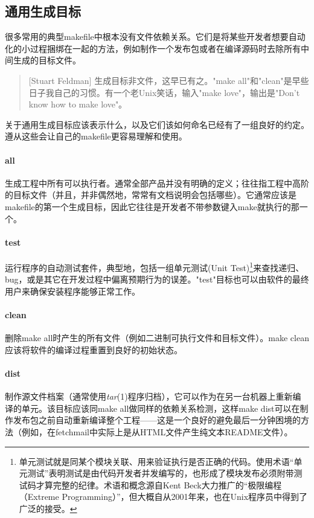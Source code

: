 \documentclass[12pt,oneside]{book}
\begin{document}
\subsection{通用生成目标}
很多常用的典型makefile中根本没有文件依赖关系。它们是将某些开发者想要自动化的小过程捆绑在一起的方法，例如制作一个发布包或者在编译源码时去除所有中间生成的目标文件。

\begin{quote}[Stuart Feldman]
生成目标非文件，这早已有之。"make all"和"clean"是早些日子我自己的习惯。有一个老Unix笑话，输入"make love"，输出是"Don't know how to make love"。
\end{quote}

关于通用生成目标应该表示什么，以及它们该如何命名已经有了一组良好的约定。遵从这些会让自己的makefile更容易理解和使用。

\paragraph{all}
生成工程中所有可以执行者。通常全部产品并没有明确的定义；往往指工程中高阶的目标文件（并且，并非偶然地，常常有文档说明会包括哪些）。它通常应该是makefile的第一个生成目标，因此它往往是开发者不带参数键入make就执行的那一个。

\paragraph{test}
运行程序的自动测试套件，典型地，包括一组单元测试(Unit Test)\footnote{单元测试就是同某个模块关联、用来验证执行是否正确的代码。使用术语“单元测试”表明测试是由代码开发者并发编写的，也形成了模块发布必须附带测试码才算完整的纪律。术语和概念源自Kent Beck大力推广的“极限编程（Extreme Programming）”，但大概自从2001年来，也在Unix程序员中得到了广泛的接受。}来查找递归、bug，或是其它在开发过程中偏离预期行为的误差。"test"目标也可以由软件的最终用户来确保安装程序能够正常工作。

\paragraph{clean}
删除make all时产生的所有文件（例如二进制可执行文件和目标文件）。make clean应该将软件的编译过程重置到良好的初始状态。

\paragraph{dist}
制作源文件档案（通常使用\textit{tar}(1)程序归档），它可以作为在另一台机器上重新编译的单元。该目标应该同make all做同样的依赖关系检测，这样make dist可以在制作发布包之前自动重新编译整个工程——这是一个良好的避免最后一分钟困境的方法（例如，在fetchmail中实际上是从HTML文件产生纯文本README文件）。
\end{document}
